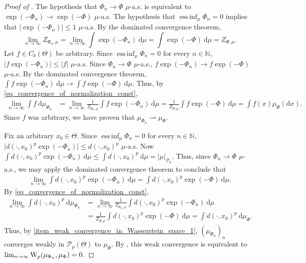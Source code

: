 \documentclass[a4paper]{scrartcl}
\theoremstyle{definition}
\numberwithin{equation}{section}
\newcommand{\N}{\mathbb{N}}
\newcommand{\rd}{\mathrm{d}}
\DeclareMathOperator*{\essinf}{ess\,inf}
\newcommand{\abs}[1]{\vert #1\vert}
\newcommand{\Was}[0]{\textup{W}}
\begin{document}
\LemmaWassersteinContinuityMisfitToPosteriorMap*
\begin{proof}[Proof of ]
The hypothesis that $\Phi_n\to\Phi$ $\mu$-a.s. is equivalent to $\exp(-\Phi_n)\to \exp(-\Phi)$ $\mu$-a.s. 
The hypothesis that $\essinf_\mu\Phi_n=0$ implies that $\vert \exp(-\Phi_n)\vert \leq 1$ $\mu$-a.s.
By the dominated convergence theorem,
\begin{equation}
\label{eq_convergence_of_normalization_const}
    \lim_{n\to \infty}Z_{\Phi_n,\mu}=\lim_{n\to\infty} \int \exp(-\Phi_n)~\rd\mu = \int \exp(-\Phi)~\rd\mu=Z_{\Phi,\mu}.
\end{equation}
Let $f\in C_b(\Theta)$ be arbitrary. Since $\essinf_\mu\Phi_n=0$ for every $n\in\N$, $\abs{f\exp(-\Phi_n)}\leq \abs{f}$ $\mu$-a.s. Since $\Phi_n\to\Phi$ $\mu$-a.s., $f\exp(-\Phi_n)\to f\exp(-\Phi)$ $\mu$-a.s.
By the dominated convergence theorem, $\int f \exp(-\Phi_n)~\rd\mu \to\int f\exp(-\Phi)~\rd\mu$.
Thus, by \eqref{eq_convergence_of_normalization_const}, 
\begin{align*}
\lim_{n\to \infty}\int f~\rd\mu_{\Phi_n} &= \lim_{n\to \infty}\frac{1}{Z_{\Phi_n,\mu}} \int f\exp(-\Phi_n)~\rd\mu = \frac{1}{Z_{\Phi,\mu}} \int f\exp(-\Phi)~\rd\mu =  \int f(x) \mu_{\Phi}(\rd x). 
\end{align*}
Since $f$ was arbitrary, we have proven that $\mu_{\Phi_n}\rightharpoonup\mu_\Phi$.

Fix an arbitrary $x_0\in\Theta$. Since $\essinf_\mu\Phi_n=0$ for every $n\in\N$, $\abs{d(\cdot,x_0)^p\exp(-\Phi_n)}\leq d(\cdot,x_0)^p$ $\mu$-a.s. 
Now $\int d(\cdot,x_0)^p\exp(-\Phi_n)~\rd \mu\leq \int  d(\cdot,x_0)^p ~\rd\mu=\abs{\mu}_{\mathcal{P}_p}$.
Thus, since $\Phi_n\to\Phi$ $\mu$-a.s., we may apply the dominated convergence theorem to conclude that
\begin{align*}
 \lim_{n\to\infty} \int d(\cdot,x_0)^p \exp(-\Phi_n)~\rd\mu =\int d(\cdot,x_0)^p \exp(-\Phi)~\rd\mu.
\end{align*}
By \eqref{eq_convergence_of_normalization_const},
\begin{align*}
\lim_{n\to\infty}\int d(\cdot,x_0)^p~\rd\mu_{\Phi_n} &= \lim_{n\to\infty} \frac{1}{Z_{\Phi_n,\mu}}\int d(\cdot,x_0)^p\exp(-\Phi_n)~\rd\mu \\
&= \frac{1}{Z_{\Phi,\mu}}\int d(\cdot,x_0)^p \exp(-\Phi)~\rd\mu = \int d(\cdot,x_0)^p~\rd\mu_{\Phi}.
\end{align*}
Thus, by \ref{item_weak_convergence_in_Wasserstein_space_1}, $(\mu_{\Phi_n})_n$ converges weakly in $\mathcal{P}_p(\Theta)$ to $\mu_\Phi$.
By \cite[Theorem 6.9]{Villani2009}, this weak convergence is equivalent to $\lim_{n\to \infty} \Was_p(\mu_{\Phi_n},\mu_{\Phi})=0$.
\end{proof}
\end{document}
